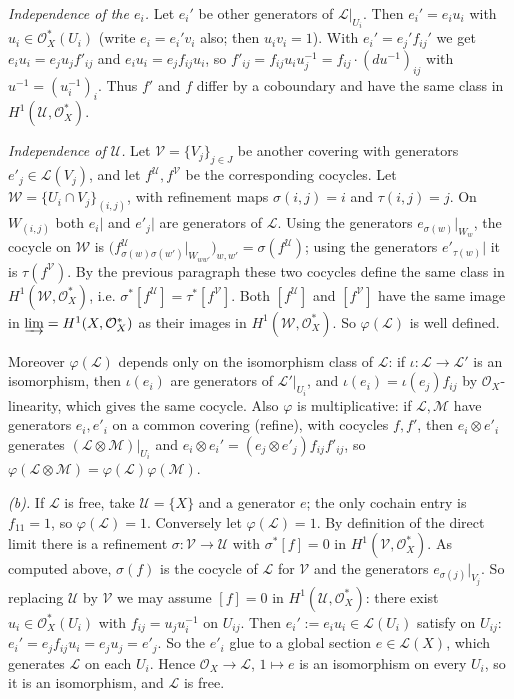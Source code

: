 \documentclass[11pt]{article}
\begin{document}
\emph{Independence of the $e_i$.} Let $e_i'$ be other generators of $\mathcal L|_{U_i}$. Then $e_i'=e_iu_i$ with $u_i\in\mathcal O_X^*(U_i)$ (write $e_i=e_i'v_i$ also; then $u_iv_i=1$). With $e_i'=e_j'f_{ij}'$ we get $e_iu_i=e_ju_jf'_{ij}$ and $e_iu_i=e_jf_{ij}u_i$, so $f'_{ij}=f_{ij}u_iu_j^{-1}=f_{ij}\cdot(du^{-1})_{ij}$ with $u^{-1}=(u_i^{-1})_i$. Thus $f'$ and $f$ differ by a coboundary and have the same class in $H^1(\mathcal U,\mathcal O_X^*)$.

\emph{Independence of $\mathcal U$.} Let $\mathcal V=\{V_j\}_{j\in J}$ be another covering with generators $e'_j\in\mathcal L(V_j)$, and let $f^{\mathcal U},f^{\mathcal V}$ be the corresponding cocycles. Let $\mathcal W=\{U_i\cap V_j\}_{(i,j)}$, with refinement maps $\sigma(i,j)=i$ and $\tau(i,j)=j$. On $W_{(i,j)}$ both $e_i|$ and $e'_j|$ are generators of $\mathcal L$. Using the generators $e_{\sigma(w)}|_{W_w}$, the cocycle on $\mathcal W$ is $\bigl(f^{\mathcal U}_{\sigma(w)\sigma(w')}|_{W_{ww'}}\bigr)_{w,w'}=\sigma(f^{\mathcal U})$; using the generators $e'_{\tau(w)}|$ it is $\tau(f^{\mathcal V})$. By the previous paragraph these two cocycles define the same class in $H^1(\mathcal W,\mathcal O_X^*)$, i.e. $\sigma^*[f^{\mathcal U}]=\tau^*[f^{\mathcal V}]$. Both $[f^{\mathcal U}]$ and $[f^{\mathcal V}]$ have the same image in $\varinjlim=H^1(X,\mathcal O_X^*)$ as their images in $H^1(\mathcal W,\mathcal O_X^*)$. So $\varphi(\mathcal L)$ is well defined.

Moreover $\varphi(\mathcal L)$ depends only on the isomorphism class of $\mathcal L$: if $\iota:\mathcal L\to\mathcal L'$ is an isomorphism, then $\iota(e_i)$ are generators of $\mathcal L'|_{U_i}$, and $\iota(e_i)=\iota(e_j)f_{ij}$ by $\mathcal O_X$-linearity, which gives the same cocycle. Also $\varphi$ is multiplicative: if $\mathcal L,\mathcal M$ have generators $e_i,e'_i$ on a common covering (refine), with cocycles $f,f'$, then $e_i\otimes e'_i$ generates $(\mathcal L\otimes\mathcal M)|_{U_i}$ and $e_i\otimes e_i'=(e_j\otimes e'_j)f_{ij}f'_{ij}$, so $\varphi(\mathcal L\otimes\mathcal M)=\varphi(\mathcal L)\varphi(\mathcal M)$.

\emph{(b).} If $\mathcal L$ is free, take $\mathcal U=\{X\}$ and a generator $e$; the only cochain entry is $f_{11}=1$, so $\varphi(\mathcal L)=1$. Conversely let $\varphi(\mathcal L)=1$. By definition of the direct limit there is a refinement $\sigma:\mathcal V\to\mathcal U$ with $\sigma^*[f]=0$ in $H^1(\mathcal V,\mathcal O_X^*)$. As computed above, $\sigma(f)$ is the cocycle of $\mathcal L$ for $\mathcal V$ and the generators $e_{\sigma(j)}|_{V_j}$. So replacing $\mathcal U$ by $\mathcal V$ we may assume $[f]=0$ in $H^1(\mathcal U,\mathcal O_X^*)$: there exist $u_i\in\mathcal O_X^*(U_i)$ with $f_{ij}=u_ju_i^{-1}$ on $U_{ij}$. Then $e_i':=e_iu_i\in\mathcal L(U_i)$ satisfy on $U_{ij}$: $e_i'=e_jf_{ij}u_i=e_ju_j=e'_j$. So the $e'_i$ glue to a global section $e\in\mathcal L(X)$, which generates $\mathcal L$ on each $U_i$. Hence $\mathcal O_X\to\mathcal L$, $1\mapsto e$ is an isomorphism on every $U_i$, so it is an isomorphism, and $\mathcal L$ is free.
\end{document}
